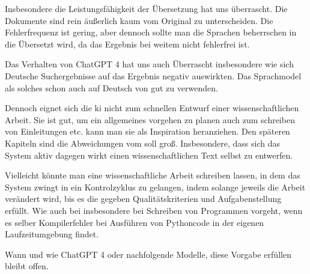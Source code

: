 
Insbesondere die Leistungsfähigkeit der Übersetzung hat uns überrascht. Die Dokumente sind rein äußerlich kaum vom Original zu unterscheiden. Die Fehlerfrequenz ist gering, aber dennoch sollte man die Sprachen beherrschen in die Übersetzt wird, da das Ergebnis bei weitem nicht fehlerfrei ist.

Das Verhalten von ChatGPT 4 hat uns auch Überrascht insbesondere wie sich Deutsche Suchergebnisse auf das Ergebnis negativ auswirkten. Das Sprachmodel als solches schon auch auf Deutsch von gut zu verwenden.

Dennoch eignet sich die \gls{ki} nicht zum schnellen Entwurf einer wissenschaftlichen Arbeit. Sie ist gut, um ein allgemeines vorgehen zu planen auch zum schreiben von Einleitungen etc. kann man sie als Inspiration heranziehen. Den späteren Kapiteln sind die Abweichungen vom soll groß. Insbesondere, dass sich das System aktiv dagegen wirkt einen wissenschaftlichen Text selbst zu entwerfen.

Vielleicht könnte man eine wissenschaftliche Arbeit schreiben lassen, in dem das System zwingt in ein Kontrolzyklus zu gelangen, indem solange jeweils die Arbeit verändert wird, bis es die gegeben Qualitätskriterien und Aufgabenstellung erfüllt. Wie auch bei insbesondere bei Schreiben von Programmen vorgeht, wenn es selber Kompilerfehler bei Ausführen von Pythoncode in der eigenen Laufzeitumgebung findet.

Wann und wie ChatGPT 4 oder nachfolgende Modelle, diese Vorgabe erfüllen bleibt offen.